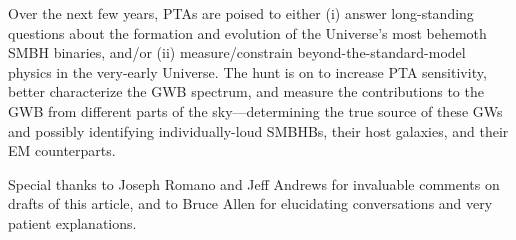 \documentclass[onecolumn,authoryear]{els-mrw}
\begin{document}
Over the next few years, PTAs are poised to either (i) answer long-standing questions about the formation and evolution of the Universe's most behemoth SMBH binaries, and/or (ii) measure/constrain beyond-the-standard-model physics in the very-early Universe.  The hunt is on to increase PTA sensitivity, better characterize the GWB spectrum, and measure the contributions to the GWB from different parts of the sky---determining the true source of these GWs and possibly identifying individually-loud SMBHBs, their host galaxies, and their EM counterparts.







\begin{ack}[Acknowledgments]

Special thanks to Joseph Romano and Jeff Andrews for invaluable comments on drafts of this article, and to Bruce Allen for elucidating conversations and very patient explanations.
\end{ack}



% 

\end{document}
